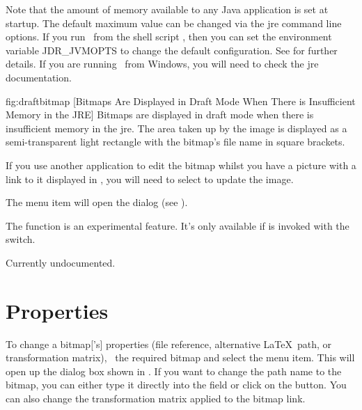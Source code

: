 Note that the amount of memory available to any Java application is
set at startup. The default maximum value can be changed via the
\gls{jre} command line options.  If you run \FlowframTk\ from the
shell script , then you can set the environment
variable \gls{JDR_JVMOPTS} to change the default configuration. See
 for further details. If you are running
\FlowframTk\ from Windows, you will need to check the \gls*{jre}
documentation.

\FloatFig
  {fig:draftbitmap}
  {}
  [Bitmaps Are Displayed in Draft Mode When There is Insufficient Memory in the JRE]
  {Bitmaps are displayed in draft mode
when there is insufficient memory in the \gls{jre}. The area taken up by
the image is displayed as a semi-transparent light  rectangle
with the bitmap's file name in square brackets.}


If you use another application to edit the bitmap whilst
you have a picture with a link to it displayed in \FlowframTk, you will
need to select  to update the image.


The  menu item will open the 
 dialog (see ).


The  function is an experimental
feature. It's only available if  is invoked with
the  switch.

Currently undocumented.

\section{Properties}\label{sec:bitmapprops}


To change a \gls{bitmap}['s] properties (file reference, alternative
\LaTeX\ path, or transformation matrix), \select\
the required \gls{bitmap} and select the 
menu item. This will open up the \dialog{bitmap_properties} dialog box shown in
\figureref{fig:bitmapprops}. If you want to change the path name to
the bitmap, you can either type it directly into the
 field or click on the
 button. You can also change the
transformation matrix applied to the bitmap link.

